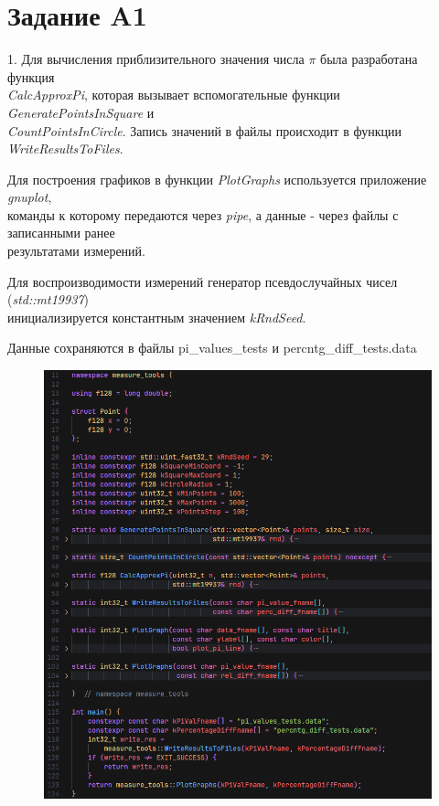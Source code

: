\documentclass[11pt,a4paper]{article}
\begin{document}
\section*{Задание A1}

1. Для вычисления приблизительного значения числа $ \pi $ была разработана функция \\
\textit{CalcApproxPi}, которая вызывает вспомогательные функции \textit{GeneratePointsInSquare} и \\
\textit{CountPointsInCircle}. Запись значений в файлы происходит в функции \textit{WriteResultsToFiles}.

    Для построения графиков в функции \textit{PlotGraphs} используется приложение \textit{gnuplot}, \\
команды к которому передаются через \textit{pipe}, а данные - через файлы с записанными ранее \\
результатами измерений.

    Для воспроизводимости измерений генератор псевдослучайных чисел (\textit{std::mt19937}) \\
инициализируется константным значением \textit{kRndSeed}.

    Данные сохраняются в файлы pi\_values\_tests и percntg\_diff\_tests.data

\begin{figure}[hp]
    \centering
    \includegraphics[scale=0.65]{a1_img1.png}
\end{figure}
\end{document}
